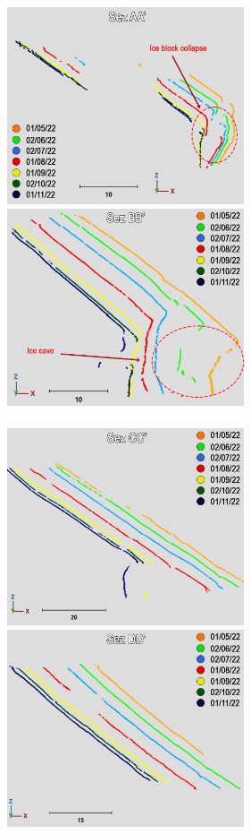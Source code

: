 \begin{figure}
  \begin{center}
    \includegraphics[width=70mm]{4_sec_aa.png} \quad
    \includegraphics[width=70mm]{4_sec_bb.png} \\
     \hspace{70mm}  \\ \vspace{1mm}
    \includegraphics[width=70mm]{4_sec_cc.png} \quad
    \includegraphics[width=70mm]{4_sec_dd.png} \\

\end{center}
\end{figure}

